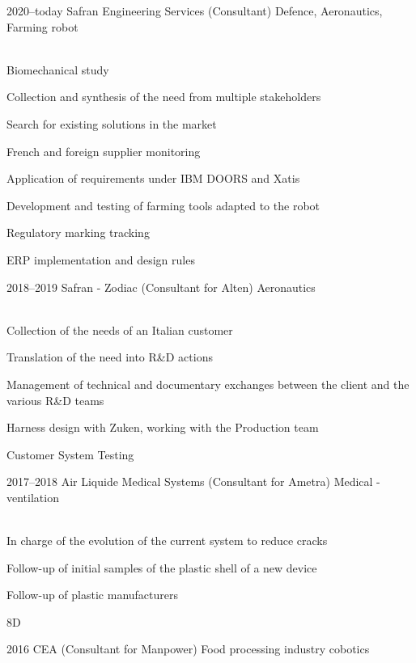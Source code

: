 \documentclass{cv-style}     %
\begin{document}
\begin{entrylist}
\entry
  {2020--today }
  {Safran Engineering Services (Consultant)}
  {Defence, Aeronautics, Farming robot}
  {\\
  
  Biomechanical study

  Collection and synthesis of the need from multiple stakeholders

  Search for existing solutions in the market

  French and foreign supplier monitoring

  Application of requirements under IBM DOORS and Xatis
  
  Development and testing of farming tools adapted to the robot

  Regulatory marking tracking

  ERP implementation and design rules

  }
\entry
  {2018--2019 }
  {Safran - Zodiac (Consultant for Alten)}
  {Aeronautics}
  {\\
  
  Collection of the needs of an Italian customer

  Translation of the need into R\&D actions

  Management of technical and documentary exchanges between the client and the various R\&D teams

  Harness design with Zuken, working with the Production team

  Customer System Testing
 
  }
\entry
 {2017--2018 }
 {Air Liquide Medical Systems (Consultant for Ametra)}
 {Medical - ventilation}
 {\\
 
 In charge of the evolution of the current system to reduce cracks

 Follow-up of initial samples of the plastic shell of a new device

 Follow-up of plastic manufacturers

 8D

 }
\entry
 {2016 }
 {CEA (Consultant for Manpower)}
 {Food processing industry cobotics}
 {\\

}
\end{entrylist}
\end{document}
